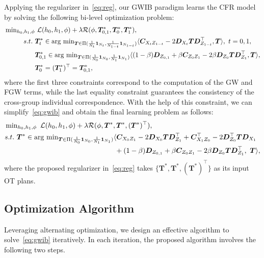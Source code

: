 \documentclass{article}
\begin{document}
Applying the regularizer in~\eqref{eq:reg}, our GWIB paradigm learns the CFR model by solving the following bi-level optimization problem:
\begin{eqnarray}\label{eq:gwib}
\begin{aligned}
    \sideset{}{_{h_0,h_1,\phi}}\min&~\mathcal{L}(h_0,h_1,\phi) + \lambda \mathcal{R}(\phi,\bm{T}_{0,1}^*,\bm{T}_{0}^*,\bm{T}_1^*),\\
    s.t.~&\bm{T}_t^*\in\arg\sideset{}{_{\bm{T}\in\Pi(\frac{1}{N_t}\bm{1}_{N_t},\frac{1}{N_{1-t}}\bm{1}_{N_{1-t}})}}\min \langle \bm{C}_{X_tZ_{1-t}}-2\bm{D}_{X_t}\bm{T}\bm{D}_{Z_{1-t}}^{\top},\bm{T}\rangle,~t=0,1,\\
    &\bm{T}_{0,1}^*\in\arg\sideset{}{_{\bm{T}\in\Pi(\frac{1}{N_0}\bm{1}_{N_0},\frac{1}{N_{1}}\bm{1}_{N_{1}})}}\min \langle (1-\beta)\bm{D}_{Z_{0,1}}+\beta\bm{C}_{Z_0Z_1}-2\beta\bm{D}_{Z_0}\bm{T}\bm{D}_{Z_1}^{\top},\bm{T}\rangle,\\
    &\bm{T}_{0}^*=(\bm{T}_{1}^*)^{\top}=\bm{T}_{0,1}^*,
\end{aligned}
\end{eqnarray}
where the first three constraints correspond to the computation of the GW and FGW terms, while the last equality constraint guarantees the consistency of the cross-group individual correspondence.
With the help of this constraint, we can simplify~\eqref{eq:gwib} and obtain the final learning problem as follows:
\begin{eqnarray}\label{eq:gwib2}
\begin{aligned}
    &\sideset{}{_{h_0,h_1,\phi}}\min~\mathcal{L}(h_0,h_1,\phi) + \lambda \mathcal{R}(\phi,\bm{T}^*,\bm{T}^*,(\bm{T}^*)^{\top}),\\
    &s.t.~\bm{T}^*\in\arg\sideset{}{_{\bm{T}\in\Pi(\frac{1}{N_0}\bm{1}_{N_0},\frac{1}{N_{1}}\bm{1}_{N_{1}})}}\min \langle \bm{C}_{X_0Z_1}-2\bm{D}_{X_0}\bm{T}\bm{D}_{Z_1}^{\top}+\bm{C}_{X_1Z_0}^{\top}-2\bm{D}_{Z_0}^{\top}\bm{T}\bm{D}_{X_1}\\
    &\hspace{5.5cm}+(1-\beta)\bm{D}_{Z_{0,1}}+\beta\bm{C}_{Z_0Z_1}-2\beta\bm{D}_{Z_0}\bm{T}\bm{D}_{Z_1}^{\top},~\bm{T}\rangle,
\end{aligned}
\end{eqnarray}
where the proposed regularizer in~\eqref{eq:reg} takes $\{\bm{T}^*,\bm{T}^*,(\bm{T}^*)^{\top}\}$ as its input OT plans.

\subsection{Optimization Algorithm}\label{sec-learn}
Leveraging alternating optimization, we design an effective algorithm to solve~\eqref{eq:gwib} iteratively.
In each iteration, the proposed algorithm involves the following two steps.
\end{document}
